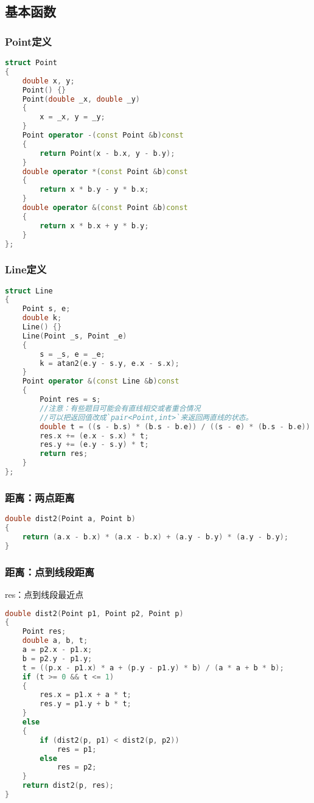 \subsection{基本函数}
    \subsubsection{Point定义}
        \begin{lstlisting}[language=c++]
struct Point
{
    double x, y;
    Point() {}
    Point(double _x, double _y)
    {
        x = _x, y = _y;
    }
    Point operator -(const Point &b)const
    {
        return Point(x - b.x, y - b.y);
    }
    double operator *(const Point &b)const
    {
        return x * b.y - y * b.x;
    }
    double operator &(const Point &b)const
    {
        return x * b.x + y * b.y;
    }
};
        \end{lstlisting}
    \subsubsection{Line定义}
        \begin{lstlisting}[language=c++]
struct Line
{
    Point s, e;
    double k;
    Line() {}
    Line(Point _s, Point _e)
    {
        s = _s, e = _e;
        k = atan2(e.y - s.y, e.x - s.x);
    }
    Point operator &(const Line &b)const
    {
        Point res = s;
        //注意：有些题目可能会有直线相交或者重合情况
        //可以把返回值改成`pair<Point,int>`来返回两直线的状态。
        double t = ((s - b.s) * (b.s - b.e)) / ((s - e) * (b.s - b.e));
        res.x += (e.x - s.x) * t;
        res.y += (e.y - s.y) * t;
        return res;
    }
};
        \end{lstlisting}
    \subsubsection{距离：两点距离}
        \begin{lstlisting}[language=c++]
double dist2(Point a, Point b)
{
    return (a.x - b.x) * (a.x - b.x) + (a.y - b.y) * (a.y - b.y);
}
        \end{lstlisting}
    \subsubsection{距离：点到线段距离}
        res：点到线段最近点
        \begin{lstlisting}[language=c++]
double dist2(Point p1, Point p2, Point p)
{
    Point res;
    double a, b, t;
    a = p2.x - p1.x;
    b = p2.y - p1.y;
    t = ((p.x - p1.x) * a + (p.y - p1.y) * b) / (a * a + b * b);
    if (t >= 0 && t <= 1)
    {
        res.x = p1.x + a * t;
        res.y = p1.y + b * t;
    }
    else
    {
        if (dist2(p, p1) < dist2(p, p2))
            res = p1;
        else
            res = p2;
    }
    return dist2(p, res);
}
        \end{lstlisting}
